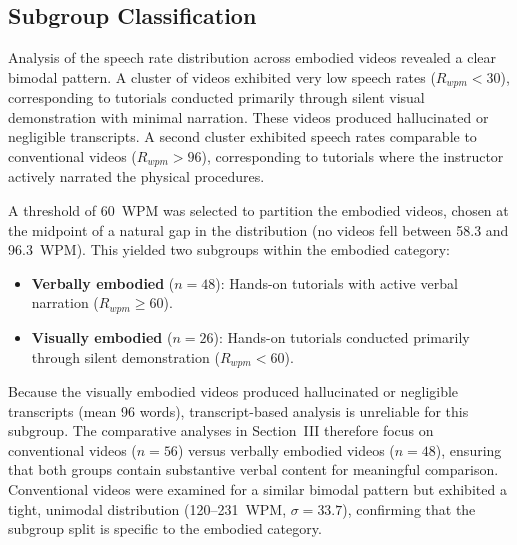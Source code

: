 \subsection{Subgroup Classification}

Analysis of the speech rate distribution across embodied videos revealed a clear bimodal pattern. A cluster of videos exhibited very low speech rates ($R_{wpm} < 30$), corresponding to tutorials conducted primarily through silent visual demonstration with minimal narration. These videos produced hallucinated or negligible transcripts. A second cluster exhibited speech rates comparable to conventional videos ($R_{wpm} > 96$), corresponding to tutorials where the instructor actively narrated the physical procedures.

A threshold of 60~WPM was selected to partition the embodied videos, chosen at the midpoint of a natural gap in the distribution (no videos fell between 58.3 and 96.3~WPM). This yielded two subgroups within the embodied category:
\begin{itemize}
    \item \textbf{Verbally embodied} ($n = 48$): Hands-on tutorials with active verbal narration ($R_{wpm} \geq 60$).
    \item \textbf{Visually embodied} ($n = 26$): Hands-on tutorials conducted primarily through silent demonstration ($R_{wpm} < 60$).
\end{itemize}

\noindent Because the visually embodied videos produced hallucinated or negligible transcripts (mean 96 words), transcript-based analysis is unreliable for this subgroup. The comparative analyses in Section~III therefore focus on conventional videos ($n = 56$) versus verbally embodied videos ($n = 48$), ensuring that both groups contain substantive verbal content for meaningful comparison. Conventional videos were examined for a similar bimodal pattern but exhibited a tight, unimodal distribution (120--231~WPM, $\sigma = 33.7$), confirming that the subgroup split is specific to the embodied category.


